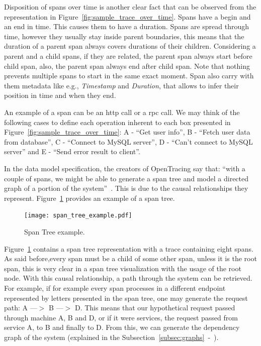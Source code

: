 Disposition of spans over time is another clear fact that can be observed from the representation in Figure~\ref{fig:sample_trace_over_time}. Spans have a begin and an end in time. This causes them to have a duration. Spans are spread through time, however they usually stay inside parent boundaries, this means that the duration of a parent span always covers durations of their children. Considering a parent and a child spans, if they are related, the parent span always start before child span, also, the parent span always end after child span. Note that nothing prevents multiple spans to start in the same exact moment. Span also carry with them metadata like e.g., \emph{Timestamp} and \emph{Duration}, that allows to infer their position in time and when they end.

An example of a span can be an \gls{http} call or a \gls{rpc} call. We may think of the following cases to define each operation inherent to each box presented in Figure~\ref{fig:sample_trace_over_time}: A - ``Get user info'', B - ``Fetch user data from database'', C - ``Connect to MySQL server'', D - ``Can't connect to MySQL server'' and E - ``Send error result to client''.

In the data model specification, the creators of OpenTracing say that: ``with a couple of spans, we might be able to generate a span tree and model a directed graph of a portion of the system''~\cite{open_tracing_data_model_specification}. This is due to the causal relationships they represent. Figure~\ref{fig:span_tree_example} provides an example of a span tree.

\begin{figure}[H]
    \centering
    \texttt{[image: span\_tree\_example.pdf]}
    \caption{Span Tree example.}
    \label{fig:span_tree_example}
\end{figure}

Figure~\ref{fig:span_tree_example} contains a span tree representation with a trace containing eight spans. As said before,every span must be a child of some other span, unless it is the root span, this is very clear in a span tree visualization with the usage of the root node. With this causal relationship, a path through the system can be retrieved. For example, if for example every span processes in a different endpoint represented by letters presented in the span tree, one may generate the request path: A ---$>$ B ---$>$ D. This means that our hypothetical request passed through machine A, B and D, or if it were services, the request passed from service A, to B and finally to D. From this, we can generate the dependency graph of the system (explained in the Subsection~\ref{subsec:graphs}~-~).


